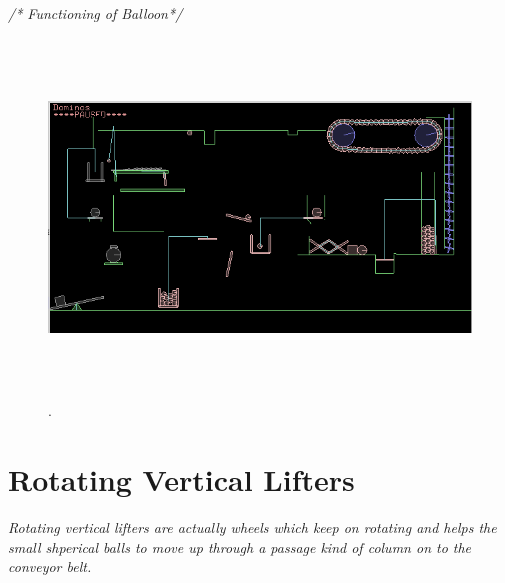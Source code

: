 \documentclass[a4paper]{article}
\begin{document}
\begin{flushleft}
\begin{itemize}
		\vspace{10pt}
			\begin{center}
				\textit{/* Functioning of Balloon*/}
			\end{center}
		\vspace{-25pt}
		\begin{figure}[H]
		\centering
		\vspace{20pt}
		\includegraphics[width=180mm,height=95mm]{4}.
		\end{figure}
			
		\newpage
		
		\section{Rotating Vertical Lifters}
			\vspace{-10pt}
		\large\textit{Rotating vertical lifters are actually wheels which keep on rotating and helps the small shperical balls to move up through a passage kind of column on to the conveyor belt.}	
		

\end{itemize}
\end{flushleft}
\end{document}
